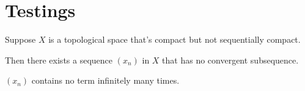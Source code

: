 \documentclass[11pt]{scrartcl}
\begin{document}
\section{Testings}

Suppose $X$ is a topological space that's compact but not sequentially compact.

Then there exists a sequence $(x_n)$ in $X$ that has no convergent subsequence.

\begin{proposition}
    $(x_n)$ contains no term infinitely many times.
    
    
\end{proposition}
\end{document}
